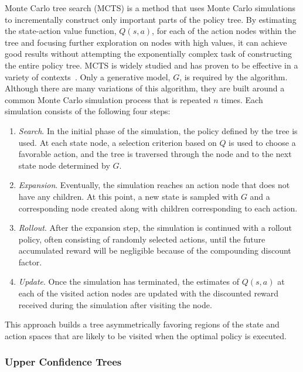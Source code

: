 Monte Carlo tree search (MCTS) is a method that uses Monte Carlo simulations to incrementally construct only important parts of the policy tree.
By estimating the state-action value function, $Q(s,a)$, for each of the action nodes within the tree and focusing further exploration on nodes with high values, it can achieve good results without attempting the exponentially complex task of constructing the entire policy tree.
MCTS is widely studied and has proven to be effective in a variety of contexts~\cite{browne2012survey}.
Only a generative model, $G$, is required by the algorithm.
Although there are many variations of this algorithm, they are built around a common Monte Carlo simulation process that is repeated $n$ times.
Each simulation consists of the following four steps:
\begin{enumerate}
    \item \emph{Search}. In the initial phase of the simulation, the policy defined by the tree is used.
        At each state node, a selection criterion based on $Q$ is used to choose a favorable action, and the tree is traversed through the node and to the next state node determined by $G$.
    \item \emph{Expansion}. Eventually, the simulation reaches an action node that does not have any children.
        At this point, a new state is sampled with $G$ and a corresponding node created along with children corresponding to each action. 
    \item \emph{Rollout}. After the expansion step, the simulation is continued with a rollout policy, often consisting of randomly selected actions, until the future accumulated reward will be negligible because of the compounding discount factor.
    \item \emph{Update}. Once the simulation has terminated, the estimates of $Q(s,a)$ at each of the visited action nodes are updated with the discounted reward received during the simulation after visiting the node.
\end{enumerate}
This approach builds a tree asymmetrically favoring regions of the state and action spaces that are likely to be visited when the optimal policy is executed.

\subsubsection{Upper Confidence Trees} \label{sec:uct}

